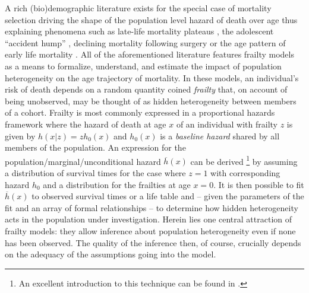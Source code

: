 \documentclass[10pt,twoside,reqno]{article}
\let\oldfootnote\footnote
\renewcommand\footnote[1]{%
\oldfootnote{\hspace{0.6mm}#1}}
\begin{document}
A rich (bio)demographic literature exists for the special case of mortality selection driving the shape of the population level hazard of death over age thus explaining phenomena such as late-life mortality plateaus \citep[e.g.,][]{Beard1959, Vaupel1979, Vaupel1993, Steinsaltz2006, Missov2015, Colchero2019}, the adolescent ``accident hump'' \citep{Remund2015}, declining mortality following surgery \citep{Hougaard1986} or the age pattern of early life mortality \citep{Vaupel1983, Hsieh1985, Trussell1985, Avraam2014}. All of the aforementioned literature features frailty models as a means to formalize, understand, and estimate the impact of population heterogeneity on the age trajectory of mortality. In these models, an individual's risk of death depends on a random quantity coined \emph{frailty} \citep{Vaupel1979} that, on account of being unobserved, may be thought of as hidden heterogeneity between members of a cohort. Frailty is most commonly expressed in a proportional hazards framework where the hazard of death at age \(x\) of an individual with frailty \(z\) is given by \(h(x|z)=zh_0(x)\) and \(h_0(x)\) is a \emph{baseline hazard} shared by all members of the population. An expression for the population/marginal/unconditional hazard \(\overline{h}(x)\) can be derived\footnote{An excellent introduction to this technique can be found in \citet{Wienke2011}.} by assuming a distribution of survival times for the case where \(z=1\) with corresponding hazard \(h_0\) and a distribution for the frailties at age \(x=0\). It is then possible to fit \(\overline{h}(x)\) to observed survival times or a life table and -- given the parameters of the fit and an array of formal relationships \citep{Vaupel1983, Vaupel2014} -- to determine how hidden heterogeneity acts in the population under investigation. Herein lies one central attraction of frailty models: they allow inference about population heterogeneity even if none has been observed. The quality of the inference then, of course, crucially depends on the adequacy of the assumptions going into the model.
\end{document}
